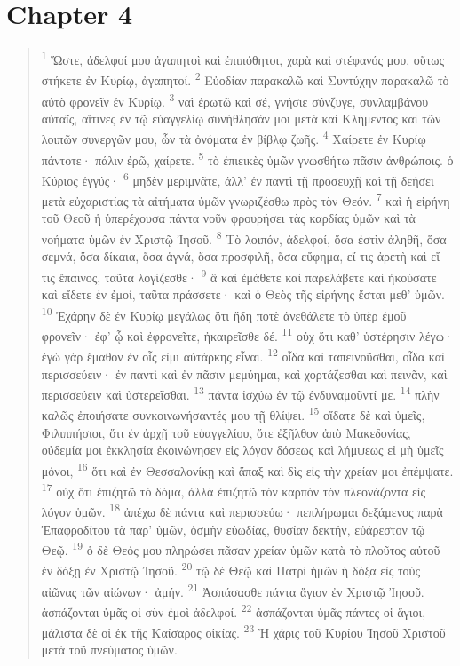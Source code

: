 \documentclass{article}
\begin{document}
\section*{Chapter 4}
\begin{verse}
\textsuperscript{1} Ὥστε, ἀδελφοί μου ἀγαπητοὶ καὶ ἐπιπόθητοι, χαρὰ καὶ στέφανός μου, οὕτως στήκετε ἐν Κυρίῳ, ἀγαπητοί.
\textsuperscript{2} Εὐοδίαν παρακαλῶ καὶ Συντύχην παρακαλῶ τὸ αὐτὸ φρονεῖν ἐν Κυρίῳ.
\textsuperscript{3} ναὶ ἐρωτῶ καὶ σέ, γνήσιε σύνζυγε, συνλαμβάνου αὐταῖς, αἵτινες ἐν τῷ εὐαγγελίῳ συνήθλησάν μοι μετὰ καὶ Κλήμεντος καὶ τῶν λοιπῶν συνεργῶν μου, ὧν τὰ ὀνόματα ἐν βίβλῳ ζωῆς.
\textsuperscript{4} Χαίρετε ἐν Κυρίῳ πάντοτε· πάλιν ἐρῶ, χαίρετε.
\textsuperscript{5} τὸ ἐπιεικὲς ὑμῶν γνωσθήτω πᾶσιν ἀνθρώποις. ὁ Κύριος ἐγγύς·
\textsuperscript{6} μηδὲν μεριμνᾶτε, ἀλλ’ ἐν παντὶ τῇ προσευχῇ καὶ τῇ δεήσει μετὰ εὐχαριστίας τὰ αἰτήματα ὑμῶν γνωριζέσθω πρὸς τὸν Θεόν.
\textsuperscript{7} καὶ ἡ εἰρήνη τοῦ Θεοῦ ἡ ὑπερέχουσα πάντα νοῦν φρουρήσει τὰς καρδίας ὑμῶν καὶ τὰ νοήματα ὑμῶν ἐν Χριστῷ Ἰησοῦ.
\textsuperscript{8} Τὸ λοιπόν, ἀδελφοί, ὅσα ἐστὶν ἀληθῆ, ὅσα σεμνά, ὅσα δίκαια, ὅσα ἁγνά, ὅσα προσφιλῆ, ὅσα εὔφημα, εἴ τις ἀρετὴ καὶ εἴ τις ἔπαινος, ταῦτα λογίζεσθε·
\textsuperscript{9} ἃ καὶ ἐμάθετε καὶ παρελάβετε καὶ ἠκούσατε καὶ εἴδετε ἐν ἐμοί, ταῦτα πράσσετε· καὶ ὁ Θεὸς τῆς εἰρήνης ἔσται μεθ’ ὑμῶν.
\textsuperscript{10} Ἐχάρην δὲ ἐν Κυρίῳ μεγάλως ὅτι ἤδη ποτὲ ἀνεθάλετε τὸ ὑπὲρ ἐμοῦ φρονεῖν· ἐφ’ ᾧ καὶ ἐφρονεῖτε, ἠκαιρεῖσθε δέ.
\textsuperscript{11} οὐχ ὅτι καθ’ ὑστέρησιν λέγω· ἐγὼ γὰρ ἔμαθον ἐν οἷς εἰμι αὐτάρκης εἶναι.
\textsuperscript{12} οἶδα καὶ ταπεινοῦσθαι, οἶδα καὶ περισσεύειν· ἐν παντὶ καὶ ἐν πᾶσιν μεμύημαι, καὶ χορτάζεσθαι καὶ πεινᾶν, καὶ περισσεύειν καὶ ὑστερεῖσθαι.
\textsuperscript{13} πάντα ἰσχύω ἐν τῷ ἐνδυναμοῦντί με.
\textsuperscript{14} πλὴν καλῶς ἐποιήσατε συνκοινωνήσαντές μου τῇ θλίψει.
\textsuperscript{15} οἴδατε δὲ καὶ ὑμεῖς, Φιλιππήσιοι, ὅτι ἐν ἀρχῇ τοῦ εὐαγγελίου, ὅτε ἐξῆλθον ἀπὸ Μακεδονίας, οὐδεμία μοι ἐκκλησία ἐκοινώνησεν εἰς λόγον δόσεως καὶ λήμψεως εἰ μὴ ὑμεῖς μόνοι,
\textsuperscript{16} ὅτι καὶ ἐν Θεσσαλονίκῃ καὶ ἅπαξ καὶ δὶς εἰς τὴν χρείαν μοι ἐπέμψατε.
\textsuperscript{17} οὐχ ὅτι ἐπιζητῶ τὸ δόμα, ἀλλὰ ἐπιζητῶ τὸν καρπὸν τὸν πλεονάζοντα εἰς λόγον ὑμῶν.
\textsuperscript{18} ἀπέχω δὲ πάντα καὶ περισσεύω· πεπλήρωμαι δεξάμενος παρὰ Ἐπαφροδίτου τὰ παρ’ ὑμῶν, ὀσμὴν εὐωδίας, θυσίαν δεκτήν, εὐάρεστον τῷ Θεῷ.
\textsuperscript{19} ὁ δὲ Θεός μου πληρώσει πᾶσαν χρείαν ὑμῶν κατὰ τὸ πλοῦτος αὐτοῦ ἐν δόξῃ ἐν Χριστῷ Ἰησοῦ.
\textsuperscript{20} τῷ δὲ Θεῷ καὶ Πατρὶ ἡμῶν ἡ δόξα εἰς τοὺς αἰῶνας τῶν αἰώνων· ἀμήν.
\textsuperscript{21} Ἀσπάσασθε πάντα ἅγιον ἐν Χριστῷ Ἰησοῦ. ἀσπάζονται ὑμᾶς οἱ σὺν ἐμοὶ ἀδελφοί.
\textsuperscript{22} ἀσπάζονται ὑμᾶς πάντες οἱ ἅγιοι, μάλιστα δὲ οἱ ἐκ τῆς Καίσαρος οἰκίας.
\textsuperscript{23} Ἡ χάρις τοῦ Κυρίου Ἰησοῦ Χριστοῦ μετὰ τοῦ πνεύματος ὑμῶν.
\end{verse}
\end{document}
